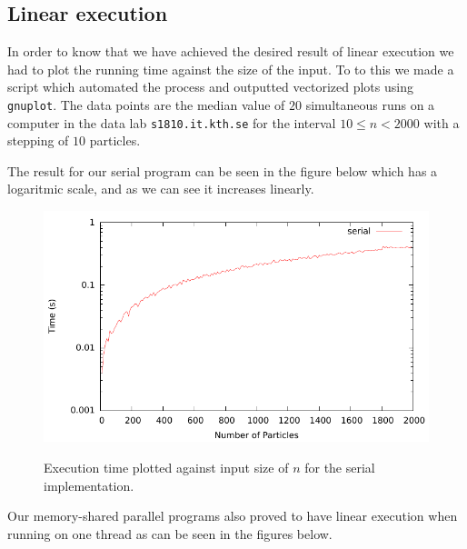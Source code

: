 

\subsection{Linear execution}

In order to know that we have achieved the desired result of linear execution we had to plot the running time against the size of the input. To to this we made a script which automated the process and outputted vectorized plots using \texttt{gnuplot}. The data points are the median value of $20$ simultaneous runs on a computer in the data lab \texttt{s1810.it.kth.se} for the interval $10 \leq n < 2000$ with a stepping of $10$ particles.

The result for our serial program can be seen in the figure below which has a logaritmic scale, and as we can see it increases linearly.

\begin{figure}[H]
	\includegraphics{plots/serial.pdf}
	\label{serial_linear}
	\caption{Execution time plotted against input size of $n$ for the serial implementation.}
\end{figure}

Our memory-shared parallel programs also proved to have linear execution when running on one thread as can be seen in the figures below.

